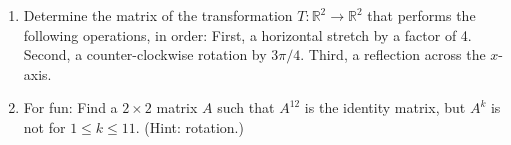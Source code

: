 \documentclass[12pt]{article}
\newcommand{\R}{\mathbb{R}}
\begin{document}
\begin{enumerate}
\vspace{2in}

\item Determine the matrix of the transformation $T:\R^2\to\R^2$ that performs the following operations, in order:  First, a horizontal stretch by a factor of 4. Second, a counter-clockwise rotation by $3\pi/4$.  Third, a reflection across the $x$-axis.

\vspace{3.5in}

\item For fun: Find a $2\times 2$ matrix $A$ such that $A^{12}$ is the identity matrix, but $A^k$ is not for $1\leq k\leq 11$. (Hint: rotation.)


 \end{enumerate}
\end{document}
